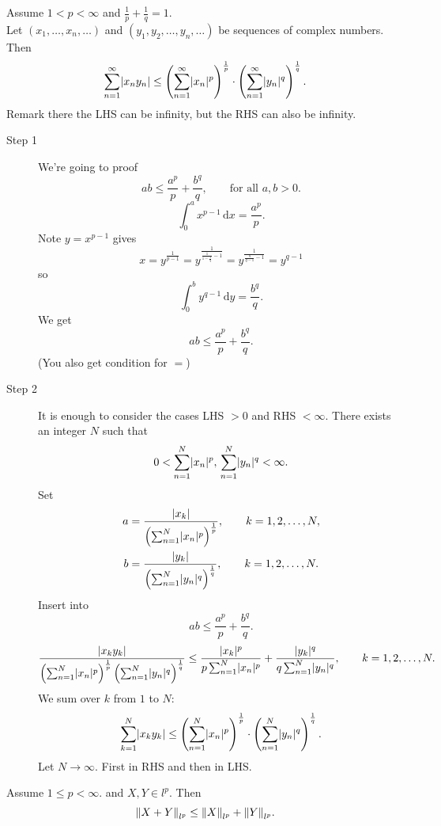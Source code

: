 \begin{theorem}
	Assume $1<p<\infty$ and $\frac{1}{p}+ \frac{1}{q}=1$. \\ Let $(x_1, \dots, x_n, \dots)$ and $(y_1,y_2, \dots, y_n, \dots)$ be sequences of complex numbers. Then
	\[
		\sum_{n=1}^{\infty}\lvert x_ny_n\rvert 
		\leq \left( \sum_{n=1}^{\infty}\lvert x_n\rvert^p \right)^{\frac{1}{p}} \cdot \left( \sum_{n=1}^{\infty}\lvert y_n\rvert^q \right)^{\frac{1}{q}}.
	\]
	Remark there the LHS can be infinity, but the RHS can also be infinity.
\end{theorem}
\begin{beweis}
	\begin{description}
		\item[Step 1] We're going to proof 
		\[
			ab \leq \frac{a^p}{p}+ \frac{b^q}{q}, \qquad \text{for all }a,b >0.
		\] 
		\[
			\int_{0}^{a} x^{p-1} \,\mathrm{d}x = \frac{a^p}{p}.
		\]
		Note $y = x^{p-1}$ gives \[
			x  = y ^{\frac{1}{p-1}} = y^{\frac{1}{\frac{1}{1-\frac{1}{q}}-1}}= y ^{\frac{1}{\frac{q}{q-1}-1}} = y^{q-1}
		\] 
		so
		\[
			\int_{0}^{b}y^{q-1} \,\mathrm{d}y = \frac{b^q}{q}.
		\]
		We get
		\[
			ab \leq \frac{a^p}{p}+ \frac{b^q}{q}.
		\]
		(You also get condition for $=$)
		\item[Step 2] It is enough to consider the cases LHS $>0$ and RHS $< \infty$. There exists an integer $N$ such that
		\[
			0 < \sum_{n=1}^{N}\lvert x_n\rvert^p, \, \sum_{n=1}^{N}\lvert y_n\rvert^q < \infty.
		\]
		Set 
		\begin{align*}
			a &= \frac{\lvert x_k\rvert}{\left( \sum_{n=1}^{N}\lvert x_n\rvert^p \right)^{\frac{1}{p}}}, \qquad k = 1,2, \dots,N, \\
			b &= \frac{\lvert y_k\rvert}{\left( \sum_{n=1}^{N}\lvert y_n\rvert^q \right)^{\frac{1}{q}}}, \qquad k = 1,2, \dots,N.
		\end{align*}
		Insert into
		\[
			ab \leq \frac{a^p}{p}+ \frac{b^q}{q}.
		\]
		\[
			\frac{\lvert x_ky_k\rvert}{\left( \sum_{n=1}^{N}\lvert x_n\rvert^p \right)^{\frac{1}{p}}\left( \sum_{n=1}^{N}\lvert y_n\rvert^q \right)^{\frac{1}{q}}} 
			\leq \frac{\lvert x_k\rvert^p}{p \sum_{n=1}^{N}\lvert x_n\rvert^p} + \frac{\lvert y_k\rvert^q}{q \sum_{n=1}^{N}\lvert y_n\rvert^q}, \qquad k = 1,2, \dots, N.
		\]
		We sum over $k$ from $1$ to $N$:
		\[
			\sum_{k=1}^{N}\lvert x_ky_k\rvert \leq  \left( \sum_{n=1}^{N}\lvert x_n\rvert^p \right)^{\frac{1}{p}} \cdot \left( \sum_{n=1}^{N}\lvert y_n\rvert^q \right)^{\frac{1}{q}}.
		\]
		Let $N \to \infty$. First in RHS and then in LHS. 
	\end{description}
\end{beweis}
\begin{theorem}
	Assume $1 \leq p < \infty$. and $X,Y \in l^p$. Then
	\[
		\norm{X+Y}_{l^p} \leq \norm{X}_{l^p} + \norm{Y}_{l^p}.
	\]
\end{theorem}
